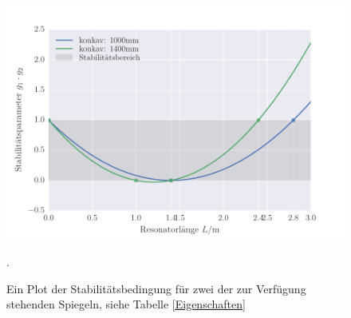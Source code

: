 \begin{figure}
\centering
\includegraphics[scale=1]{../Grafiken/Stabilitaetsparameter.pdf}
\caption{Ein Plot der Stabilitätsbedingung für zwei der zur Verfügung stehenden Spiegeln, siehe Tabelle \ref{Eigenschaften}}.
\end{figure}
